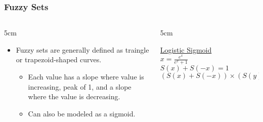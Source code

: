 \documentclass{beamer}
\begin{document}
   \begin{frame}
      \frametitle{Fuzzy Sets}
      \begin{columns}[T]
         \begin{column}[T]{5cm}
            \begin{itemize}
               \item Fuzzy sets are generally defined as traingle or trapezoid-shaped curves.
               \begin{itemize}
                  \item Each value has a slope where value is increasing, peak of 1, and a slope where the value is decreasing.
                  \item Can also be modeled as a sigmoid.
               \end{itemize}
            \end{itemize}
         \end{column}
         \begin{column}[T]{5cm}
            \begin{center}
               \underline{Logistic Sigmoid} \\
               $ x = \frac{e^{x}}{e^{x}+1} $ \\
               $ S(x) + S(-x) =  1 $ \\
               $ (S(x) + S(-x)) \times (S(y) + S(-y)) \times (S(z) + S(-z)) = 1 $ 
            \end{center}
         \end{column}
      \end{columns}
   \end{frame}
   
\end{document}

